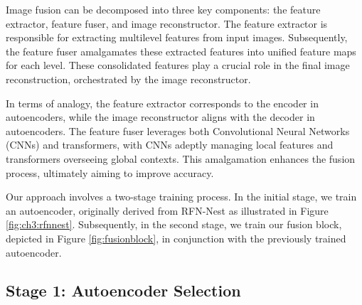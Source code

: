 \label{chp:b3}

Image fusion can be decomposed into three key components: the feature extractor, feature fuser, and image reconstructor. The feature extractor is responsible for extracting multilevel features from input images. Subsequently, the feature fuser amalgamates these extracted features into unified feature maps for each level. These consolidated features play a crucial role in the final image reconstruction, orchestrated by the image reconstructor.

In terms of analogy, the feature extractor corresponds to the encoder in autoencoders, while the image reconstructor aligns with the decoder in autoencoders. The feature fuser leverages both Convolutional Neural Networks (CNNs) and transformers, with CNNs adeptly managing local features and transformers overseeing global contexts. This amalgamation enhances the fusion process, ultimately aiming to improve accuracy.

Our approach involves a two-stage training process. In the initial stage, we train an autoencoder, originally derived from RFN-Nest \cite{li2021rfn} as illustrated in Figure \ref{fig:ch3:rfnnest}. Subsequently, in the second stage, we train our fusion block, depicted in Figure \ref{fig:fusionblock}, in conjunction with the previously trained autoencoder.

\subsection{Stage 1: Autoencoder Selection} \label{subsec:aesel}

